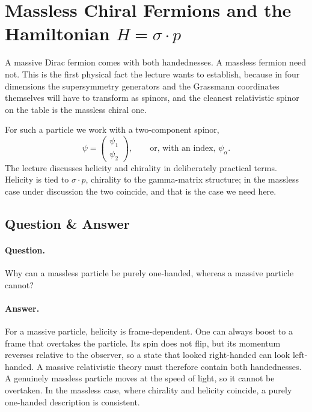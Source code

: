 \section{Massless Chiral Fermions and the Hamiltonian \(H=\sigma\cdot p\)}

A massive Dirac fermion comes with both handednesses. A massless fermion need not. This is the first physical fact the lecture wants to establish, because in four dimensions the supersymmetry generators and the Grassmann coordinates themselves will have to transform as spinors, and the cleanest relativistic spinor on the table is the massless chiral one.

For such a particle we work with a two-component spinor,
\begin{equation}
\psi=
\begin{pmatrix}
\psi_1\\
\psi_2
\end{pmatrix},
\qquad \text{or, with an index, } \psi_\alpha .
\end{equation}
The lecture discusses helicity and chirality in deliberately practical terms. Helicity is tied to \(\sigma\cdot p\), chirality to the gamma-matrix structure; in the massless case under discussion the two coincide, and that is the case we need here.

\subsection{Question \& Answer}

\paragraph{Question.} Why can a massless particle be purely one-handed, whereas a massive particle cannot?

\paragraph{Answer.} For a massive particle, helicity is frame-dependent. One can always boost to a frame that overtakes the particle. Its spin does not flip, but its momentum reverses relative to the observer, so a state that looked right-handed can look left-handed. A massive relativistic theory must therefore contain both handednesses. A genuinely massless particle moves at the speed of light, so it cannot be overtaken. In the massless case, where chirality and helicity coincide, a purely one-handed description is consistent.

